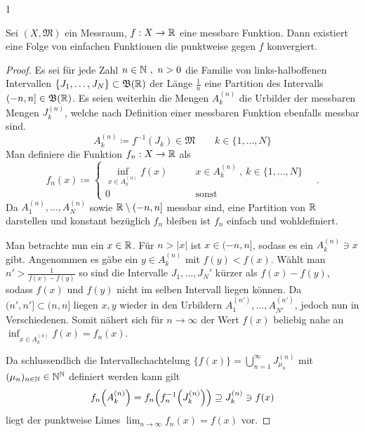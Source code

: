\documentclass{anablatt}
\begin{document}
\makeheader
\setcounter{taski}1
\task
\begin{theorem}
    Sei $(X,\mathfrak M)$ ein Messraum, $f:X \rightarrow \mathbb{R}$ eine messbare Funktion. Dann existiert eine Folge von einfachen Funktionen die punktweise gegen $f$ konvergiert.
\end{theorem}
\begin{proof}
    Es sei für jede Zahl $n \in \mathbb{N}~,~ n > 0$ die Familie von links-halboffenen Intervallen $\{J_1,\dots,J_N\} \subset \mathfrak B(\mathbb{R})$ der Länge $\frac 1 n$ eine Partition des Intervalls $(-n,n] \in \mathfrak B(\mathbb{R})$. Es seien weiterhin die Mengen $A_k^{(n)}$ die Urbilder der messbaren Mengen $J_k^{(n)}$, welche nach Definition einer messbaren Funktion ebenfalls messbar sind.
    \[ A_k^{(n)} \coloneqq f^{-1}(J_k) \in \mathfrak M \qquad k \in \{1,\dots,N\} \]
Man definiere die Funktion $f_n:X \rightarrow \mathbb{R}$ als
\[
    f_n(x) \coloneqq \begin{cases}
        \displaystyle\inf_{x \in A_k^{(n)}} f(x) \qquad&x \in A_k^{(n)}~,~ k \in \{1,\dots,N\} \\[1.5em]
        0 \qquad&\text{sonst}
        \end{cases}
        \quad.
\]
Da $A_1^{(n)},\dots,A_N^{(n)}$ sowie $\mathbb{R} \setminus (-n,n]$ messbar sind, eine Partition von $\mathbb{R}$ darstellen und konstant bezüglich $f_n$ bleiben ist $f_n$ einfach und wohldefiniert.

Man betrachte nun ein $x \in \mathbb{R}$. Für $n > |x|$ ist $x \in (-n,n]$, sodass es ein $A_k^{(n)} \ni x$ gibt. Angenommen es gäbe ein $y \in A_k^{(n)}$ mit $f(y) < f(x)$. Wählt man $n' > \frac1{f(x)-f(y)}$ so sind die Intervalle $J_1,\dots,J_N'$ kürzer als $f(x) - f(y)$, sodass $f(x)$ und $f(y)$ nicht im selben Intervall liegen können. Da $(n',n'] \subset (n,n]$ liegen $x,y$ wieder in den Urbildern $A_1^{(n')},\dots,A_{N'}^{(n')}$, jedoch nun in Verschiedenen. Somit nähert sich für $n \rightarrow \infty$ der Wert $f(x)$ beliebig nahe an $\displaystyle\inf_{x \in A_k^{(n)}} f(x) = f_n(x)$.

Da schlussendlich die Intervallschachtelung $\{f(x)\} = \bigcup_{n=1}^\infty J^{(n)}_{\mu_n}$ mit $(\mu_n)_{n \in \mathbb{N}} \in \mathbb{N}^{\mathbb{N}}$ definiert werden kann gilt
\[ f_n\qty(A_k^{(n)}) = f_n\qty(f_n^{-1}\qty(J^{(n)}_k)) \supseteq J_k^{(n)} \ni f(x) \]
liegt der punktweise Limes $\displaystyle\lim_{n \rightarrow \infty}f_n(x) = f(x)$ vor.
\end{proof}
\end{document}
